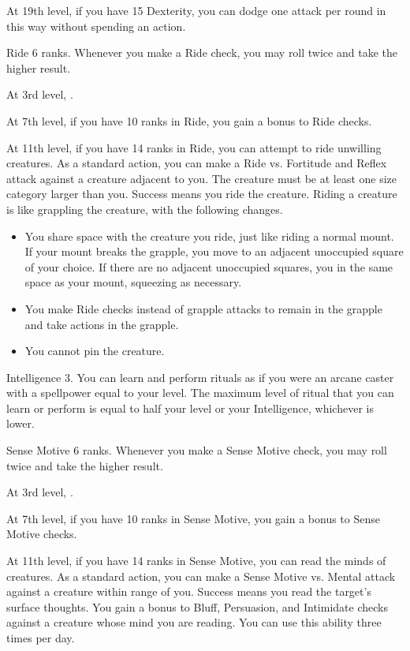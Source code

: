     At 19th level, if you have 15 Dexterity, you can dodge one attack per round in this way without spending an action.

    \featpre Ride 6 ranks.
    \featben Whenever you make a Ride check, you may roll twice and take the higher result.

    At 3rd level, \tdash.

    At 7th level, if you have 10 ranks in Ride, you gain a  bonus to Ride checks.

    At 11th level, if you have 14 ranks in Ride, you can attempt to ride unwilling creatures.
    As a standard action, you can make a Ride vs. Fortitude and Reflex attack against a creature adjacent to you.
    The creature must be at least one size category larger than you.
    Success means you ride the creature.
    Riding a creature is like grappling the creature, with the following changes.
    \begin{itemize}
        \item You share space with the creature you ride, just like riding a normal mount.
            If your mount breaks the grapple, you move to an adjacent unoccupied square of your choice.
            If there are no adjacent unoccupied squares, you in the same space as your mount, squeezing as necessary.
        \item You make Ride checks instead of grapple attacks to remain in the grapple and take actions in the grapple.
        \item You cannot pin the creature.
    \end{itemize}

    \featpre Intelligence 3.
    \featben You can learn and perform rituals as if you were an arcane caster with a spellpower equal to your level.
    The maximum level of ritual that you can learn or perform is equal to half your level or your Intelligence, whichever is lower.

    \featpre Sense Motive 6 ranks.
    \featben Whenever you make a Sense Motive check, you may roll twice and take the higher result.

    At 3rd level, \tdash.

    At 7th level, if you have 10 ranks in Sense Motive, you gain a  bonus to Sense Motive checks.

    At 11th level, if you have 14 ranks in Sense Motive, you can read the minds of creatures.
    As a standard action, you can make a Sense Motive vs. Mental attack against a creature within \rngmed range of you.
    Success means you read the target's surface thoughts.
    You gain a  bonus to Bluff, Persuasion, and Intimidate checks against a creature whose mind you are reading.
    You can use this ability three times per day.
    \magical

